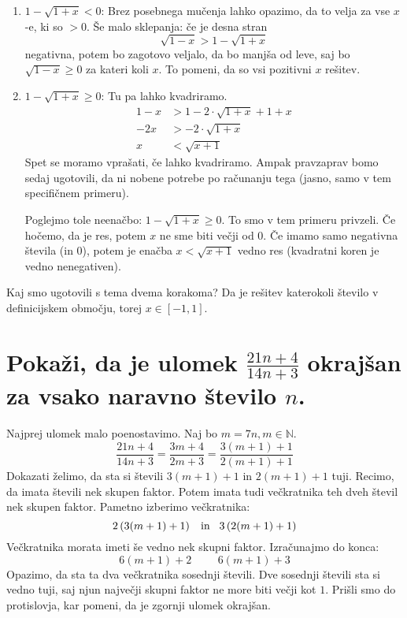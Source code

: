 \documentclass[12pt,a4paper,slovene]{article}
\begin{document}
\begin{enumerate}
    \item $1 - \sqrt{1 + x} < 0$: Brez posebnega mučenja lahko opazimo, da to velja za vse $x$-e, ki so $> 0$. Še malo sklepanja: če je desna stran
    \[\sqrt{1 - x} >1 - \sqrt{1 + x}\]
    negativna, potem bo zagotovo veljalo, da bo manjša od leve, saj bo $\sqrt{1 - x} \geqslant 0$ za kateri koli $x$. To pomeni, da so vsi pozitivni $x$ rešitev.
    \item $1 - \sqrt{1 + x} \geqslant 0$: Tu pa lahko kvadriramo.
    \begin{align*}
        1 - x &> 1 - 2 \cdot \sqrt{1 + x} + 1 + x \\
        -2x &> - 2 \cdot \sqrt{1 + x} \\
        x &< \sqrt{x + 1}
    \end{align*}
    Spet se moramo vprašati, če lahko kvadriramo. Ampak pravzaprav bomo sedaj ugotovili, da ni nobene potrebe po računanju tega (jasno, samo v tem specifičnem primeru).
    
    Poglejmo tole neenačbo: $1 - \sqrt{1 + x} \geqslant 0$. To smo v tem primeru privzeli. Če hočemo, da je res, potem $x$ ne sme biti večji od $0$. Če imamo samo negativna števila (in $0$), potem je enačba $x < \sqrt{x + 1}$ vedno res (kvadratni koren je vedno nenegativen).
\end{enumerate}
Kaj smo ugotovili s tema dvema korakoma? Da je rešitev katerokoli število v definicijskem območju, torej $x \in \left[-1, 1\right]$.

\section{Pokaži, da je ulomek $\frac{21n+4}{14n+3}$ okrajšan za vsako naravno število $n$.}

Najprej ulomek malo poenostavimo. Naj bo $m = 7 n, m \in \mathbb{N}$.
\[
    \frac{21n+4}{14n+3} = \frac{3m+4}{2m+3} = \frac{3(m+1) + 1}{2(m + 1)+1} 
\]
Dokazati želimo, da sta si števili $3(m+1) + 1$ in $2(m+1) + 1$ tuji.
Recimo, da imata števili nek skupen faktor. Potem imata tudi večkratnika teh dveh števil nek skupen faktor. Pametno izberimo večkratnika:
\[
2\left(3(m+1) + 1\right) \hspace{0.3cm} \text{in} \hspace{0.3cm} 3\left(2(m+1) + 1\right)
\]
Večkratnika morata imeti še vedno nek skupni faktor. Izračunajmo do konca:
\[
6(m+1) + 2 \hspace{1cm} 6(m+1) + 3 
\]
Opazimo, da sta ta dva večkratnika sosednji števili. Dve sosednji števili sta si vedno tuji, saj njun največji skupni faktor ne more biti večji kot $1$. Prišli smo do protislovja, kar pomeni, da je zgornji ulomek okrajšan.
\end{document}
